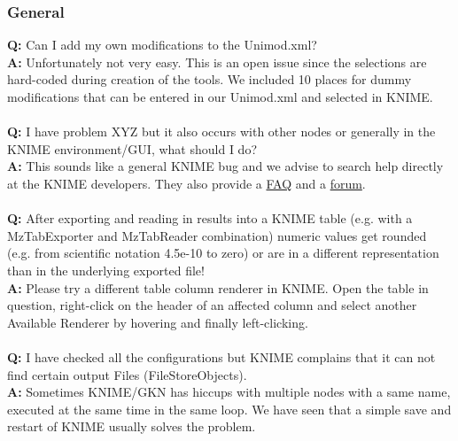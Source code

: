 \subsubsection{General}
\textbf{Q:} Can I add my own modifications to the Unimod.xml?\\
\textbf{A:} Unfortunately not very easy. This is an open issue since the selections are
hard-coded during creation of the tools. We included 10 places for dummy modifications that can be entered in our Unimod.xml and selected in KNIME.
\\\\
\textbf{Q:} I have problem XYZ but it also occurs with other nodes or generally in the KNIME environment/GUI, what should I do?\\
\textbf{A:} This sounds like a general KNIME bug and we advise to search help directly at the KNIME developers. They also provide a \href{https://tech.knime.org/
faq}{FAQ} and a \href{https://tech.knime.org/forum}{forum}.
\\\\
\textbf{Q:} After exporting and reading in results into a KNIME table (e.g. with a MzTabExporter and MzTabReader combination) numeric values get rounded (e.g. from scientific notation 4.5e-10 to zero) or are in a different representation than in the underlying exported file!\\
\textbf{A:} Please try a different table column renderer in KNIME. Open the table in question, right-click on the header of an affected column and select another Available Renderer by hovering and finally left-clicking.
\\\\
\textbf{Q:} I have checked all the configurations but KNIME complains that it can not find certain output Files (FileStoreObjects).\\
\textbf{A:} Sometimes KNIME/GKN has hiccups with multiple nodes with a same name, executed at the same time in the same loop. We have seen that a simple save and restart of KNIME usually solves the problem.

